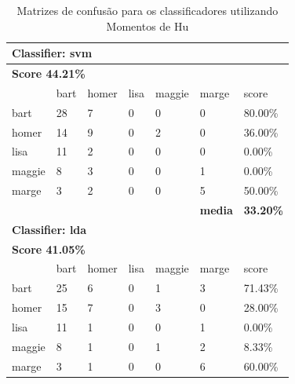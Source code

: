 \documentclass[paper=a4, fontsize=11pt]{scrartcl} %
\numberwithin{equation}{section} %
\numberwithin{figure}{section} %
\numberwithin{table}{section} %
\begin{document}
\begin{table}[!htb]
\centering
\caption{Matrizes de confusão para os classificadores utilizando Momentos de Hu}
\label{tbl:hog}
\begin{tabular}{l|l|l|l|l|l|l} \hline
\multicolumn{7}{l}{\textbf{Classifier: svm}}                                                \\ \hline
\multicolumn{7}{l}{\textbf{Score 44.21\%}}                                                  \\ \hline
          & bart      & homer     & lisa      & maggie    & marge          & score            \\ \hline
bart      & 28        & 7         & 0         & 0         & 0              & 80.00\%          \\ \hline
homer     & 14        & 9         & 0         & 2         & 0              & 36.00\%          \\ \hline
lisa      & 11        & 2         & 0         & 0         & 0              & 0.00\%           \\ \hline
maggie    & 8         & 3         & 0         & 0         & 1              & 0.00\%           \\ \hline
marge     & 3         & 2         & 0         & 0         & 5              & 50.00\%          \\ \hline
\textbf{} & \textbf{} & \textbf{} & \textbf{} & \textbf{} & \textbf{media} & \textbf{33.20\%} \\ \hline
\multicolumn{7}{l}{\textbf{Classifier: lda}}                                                \\ \hline
\multicolumn{7}{l}{\textbf{Score 41.05\%}}                                                  \\ \hline
          & bart      & homer     & lisa      & maggie    & marge          & score            \\ \hline
bart      & 25        & 6         & 0         & 1         & 3              & 71.43\%          \\ \hline
homer     & 15        & 7         & 0         & 3         & 0              & 28.00\%          \\ \hline
lisa      & 11        & 1         & 0         & 0         & 1              & 0.00\%           \\ \hline
maggie    & 8         & 1         & 0         & 1         & 2              & 8.33\%           \\ \hline
marge     & 3         & 1         & 0         & 0         & 6              & 60.00\%          \\ \hline

\end{tabular}
\end{table}
\end{document}
